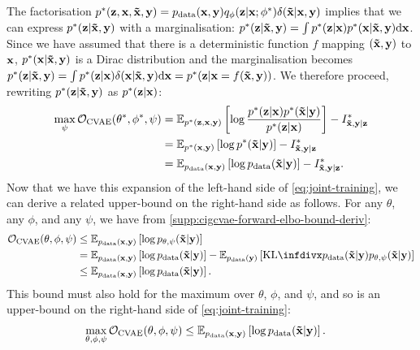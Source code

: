 The factorisation ${p}^*({\mathbf{z}}, {\mathbf{x}}, \mathbf{\tilde{x}}{}, {\mathbf{y}}) = p_{\rm{data}} ({\mathbf{x}},
{\mathbf{y}}) q_\phi({\mathbf{z}}|{\mathbf{x}}; {\phi}^*)\delta(\mathbf{\tilde{x}}{}|{\mathbf{x}},{\mathbf{y}})$ implies that
we can express ${p}^*{}({\mathbf{z}}|\mathbf{\tilde{x}}{},{\mathbf{y}})$ with a marginalisation:
${p}^*{}({\mathbf{z}}|\mathbf{\tilde{x}}{},{\mathbf{y}})=\int {p}^*{}({\mathbf{z}}|{\mathbf{x}})
{p}^*{}({\mathbf{x}}|\mathbf{\tilde{x}}{},{\mathbf{y}}) \mathrm{d}{\mathbf{x}}$. Since we have assumed that
there is a deterministic function $f$ mapping $(\mathbf{\tilde{x}}{},{\mathbf{y}})$ to ${\mathbf{x}}$,
${p}^*{}({\mathbf{x}}|\mathbf{\tilde{x}}{},{\mathbf{y}})$ is a Dirac distribution and the
marginalisation becomes ${p}^*{}({\mathbf{z}}|\mathbf{\tilde{x}}{},{\mathbf{y}}) = \int {p}^*{}({\mathbf{z}}|{\mathbf{x}})
\delta({\mathbf{x}}|\mathbf{\tilde{x}}{},{\mathbf{y}}) \mathrm{d}{\mathbf{x}} =
{p}^*{}({\mathbf{z}}|{\mathbf{x}}=f(\mathbf{\tilde{x}}{},{\mathbf{y}}))$. We therefore proceed, rewriting
${p}^*{}({\mathbf{z}}|\mathbf{\tilde{x}}{},{\mathbf{y}})$ as ${p}^*{}({\mathbf{z}}|{\mathbf{x}})$:
\begin{align}
  \max_{\psi } {\mathcal{O}}_\text{CVAE}({\theta}^*, {\phi}^*, \psi ) &= \mathbb{E}_{{p}^*{}({\mathbf{z}},{\mathbf{x}},{\mathbf{y}})} \left[ \log \frac{{p}^*{}({\mathbf{z}}|{\mathbf{x}}){p}^*{}(\mathbf{\tilde{x}}{}|{\mathbf{y}})}{{p}^*({\mathbf{z}}|{\mathbf{x}})} \right] - I^*_{\mathbf{\tilde{x}}{},\mathbf{y}{}|\mathbf{z}{}}{} \label{eq:post-mapping}\\
                                                                                           &= \mathbb{E}_{{p}^*{}({\mathbf{x}},{\mathbf{y}})} \left[ \log {p}^*{} (\mathbf{\tilde{x}}{}|{\mathbf{y}}) \right] - I^*_{\mathbf{\tilde{x}}{},\mathbf{y}{}|\mathbf{z}{}}{}\\
                                                                                           &= \mathbb{E}_{p_{\rm{data}} ({\mathbf{x}},{\mathbf{y}})} \left[ \log p_{\rm{data}}  (\mathbf{\tilde{x}}{}|{\mathbf{y}}) \right] - I^*_{\mathbf{\tilde{x}}{},\mathbf{y}{}|\mathbf{z}{}}{}. \label{eq:max-partphi-bound}
\end{align}
Now that we have this expansion of the left-hand side of
\cref{eq:joint-training}, we can derive a related upper-bound on the right-hand
side as follows. For any $\theta$, any $\phi$, and any $\psi$, we have
from \cref{supp:cigcvae-forward-elbo-bound-deriv}:
\begin{align}
  \gO_\text{CVAE}(\theta, \phi, \psi ) &\leq \EX_{\pdata (\rvx,\rvy)} \left[ \log p_{\theta,\psi}(\tildeI{}|\rvy) \right] \\
                                                     &= \EX_{\pdata (\rvx,\rvy)} \left[ \log \pdata (\tildeI{}|\rvy) \right] - \EX_{\pdata (\rvy)}\left[ \kl{\pdata (\tildeI{}|\rvy)}{p_{\theta,\psi}(\tildeI{}|\rvy)} \right] \\
                                                     &\leq \EX_{\pdata (\rvx,\rvy)} \left[ \log \pdata (\tildeI{}|\rvy) \right].
\end{align}
This bound must also hold for the maximum over $\theta$, $\phi$, and
$\psi$, and so is an upper-bound on the right-hand side of \cref{eq:joint-training}:
\begin{align}
  \max_{\theta, \phi, \psi } {\mathcal{O}}_\text{CVAE}(\theta, \phi, \psi ) &\leq \mathbb{E}_{p_{\rm{data}} ({\mathbf{x}},{\mathbf{y}})} \left[ \log p_{\rm{data}} (\mathbf{\tilde{x}}{}|{\mathbf{y}}) \right]. \label{eq:max-all-bound}
\end{align}

